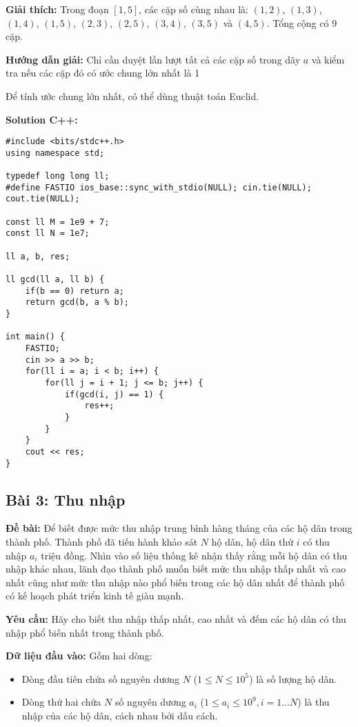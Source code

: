 \documentclass[12pt]{scrartcl}  %
\begin{document}
\textbf{Giải thích:}
Trong đoạn $[1, 5]$, các cặp số cùng nhau là: $(1, 2)$, $(1, 3)$, $(1, 4)$, $(1, 5)$, $(2, 3)$, $(2, 5)$, $(3, 4)$, $(3, 5)$ và $(4, 5)$. Tổng cộng có $9$ cặp.

\textbf{Hướng dẫn giải:} Chỉ cần duyệt lần lượt tất cả các cặp số trong dãy $a$ và kiểm tra
nếu các cặp đó có ước chung lớn nhất là 1

Để tính ước chung lớn nhất, có thể dùng thuật toán Euclid.

\textbf{Solution C++:}
\begin{lstlisting}
#include <bits/stdc++.h>
using namespace std;

typedef long long ll;
#define FASTIO ios_base::sync_with_stdio(NULL); cin.tie(NULL); cout.tie(NULL);

const ll M = 1e9 + 7;
const ll N = 1e7;

ll a, b, res;

ll gcd(ll a, ll b) {
    if(b == 0) return a;
    return gcd(b, a % b);
}

int main() {
    FASTIO;
    cin >> a >> b;
    for(ll i = a; i < b; i++) {
        for(ll j = i + 1; j <= b; j++) {
            if(gcd(i, j) == 1) {
                res++;
            }
        }
    }
    cout << res;
}
\end{lstlisting}

\subsection{Bài 3: Thu nhập}
\textbf{Đề bài:}
Để biết được mức thu nhập trung bình hàng tháng của các hộ dân trong thành phố. Thành phố đã tiến hành khảo sát $N$ hộ dân, hộ dân thứ $i$ có thu nhập $a_i$ triệu đồng. Nhìn vào số liệu thống kê nhận thấy rằng mỗi hộ dân có thu nhập khác nhau, lãnh đạo thành phố muốn biết mức thu nhập thấp nhất và cao nhất cũng như mức thu nhập nào phổ biến trong các hộ dân nhất để thành phố có kế hoạch phát triển kinh tế giàu mạnh.

\textbf{Yêu cầu:}
Hãy cho biết thu nhập thấp nhất, cao nhất và đếm các hộ dân có thu nhập phổ biến nhất trong thành phố.

\textbf{Dữ liệu đầu vào:}
Gồm hai dòng:
\begin{itemize}
    \item Dòng đầu tiên chứa số nguyên dương $N$ ($1 \leq N \leq 10^5$) là số lượng hộ dân.
    \item Dòng thứ hai chứa $N$ số nguyên dương $a_i$ ($1 \leq a_i \leq 10^9, i = 1 ... N$) là thu nhập của các hộ dân, cách nhau bởi dấu cách.
\end{itemize}
\end{document}
